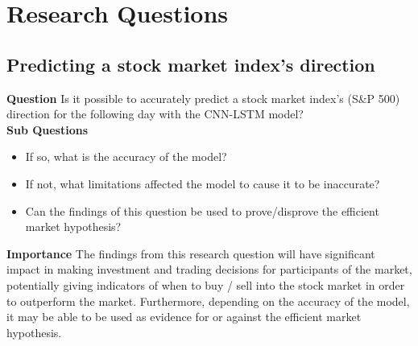 \chapter{Research Questions} \label{chap:research-questions}


\section{Predicting a stock market index's direction}
\textbf{Question} Is it possible to accurately predict a stock market index's (S\&P 500) direction for
the following day with the CNN-LSTM model?\\
\textbf{Sub Questions}
\begin{itemize}
    \item If so, what is the accuracy of the model?
    \item If not, what limitations affected the model to cause it to be inaccurate?
    \item Can the findings of this question be used to prove/disprove the efficient market hypothesis?
\end{itemize}
\textbf{Importance} The findings from this research question will have significant impact in making
investment and trading decisions for participants of the market, potentially giving indicators of
when to buy / sell into the stock market in order to outperform the market. Furthermore, depending
on the accuracy of the model, it may be able to be used as evidence for or against the efficient
market hypothesis.


